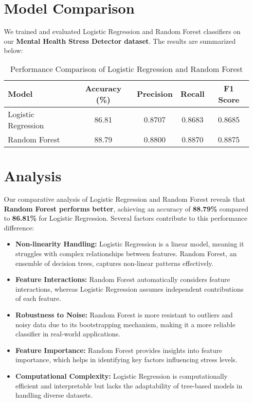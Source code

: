 \documentclass[a4paper,11pt]{article}
\begin{document}
\section{Model Comparison}

We trained and evaluated Logistic Regression and Random Forest classifiers on our \textbf{Mental Health Stress Detector dataset}. The results are summarized below:

\begin{table}[h]
    \centering
    \begin{tabular}{lcccc}
        \toprule
        \textbf{Model} & \textbf{Accuracy (\%)} & \textbf{Precision} & \textbf{Recall} & \textbf{F1 Score} \\
        \midrule
        Logistic Regression & 86.81 & 0.8707 & 0.8683 & 0.8685 \\
        Random Forest & 88.79 & 0.8800 & 0.8870 & 0.8875 \\
        \bottomrule
    \end{tabular}
    \caption{Performance Comparison of Logistic Regression and Random Forest}
    \label{tab:model_comparison}
\end{table}

\section{Analysis}

Our comparative analysis of Logistic Regression and Random Forest reveals that \textbf{Random Forest performs better}, achieving an accuracy of \textbf{88.79\%} compared to \textbf{86.81\%} for Logistic Regression. Several factors contribute to this performance difference:

\begin{itemize}
    \item \textbf{Non-linearity Handling:} Logistic Regression is a linear model, meaning it struggles with complex relationships between features. Random Forest, an ensemble of decision trees, captures non-linear patterns effectively.
    \item \textbf{Feature Interactions:} Random Forest automatically considers feature interactions, whereas Logistic Regression assumes independent contributions of each feature.
    \item \textbf{Robustness to Noise:} Random Forest is more resistant to outliers and noisy data due to its bootstrapping mechanism, making it a more reliable classifier in real-world applications.
    \item \textbf{Feature Importance:} Random Forest provides insights into feature importance, which helps in identifying key factors influencing stress levels.
    \item \textbf{Computational Complexity:} Logistic Regression is computationally efficient and interpretable but lacks the adaptability of tree-based models in handling diverse datasets.
\end{itemize}
\end{document}
